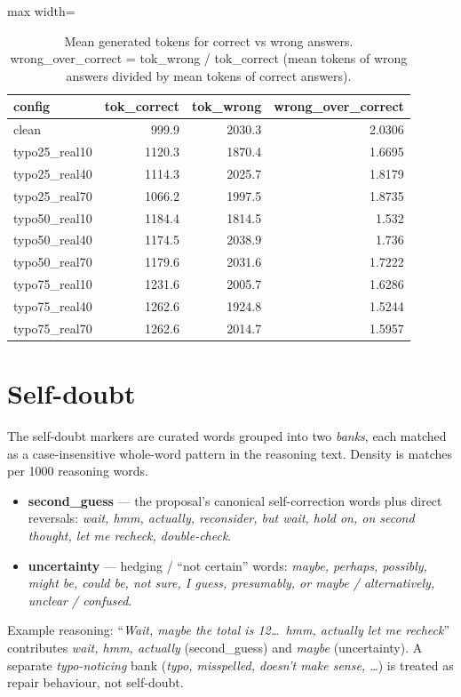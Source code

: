 \documentclass[11pt]{article}
\begin{document}
\begin{table}[H]
\centering
\caption{Mean generated tokens for correct vs wrong answers. wrong\_over\_correct = tok\_wrong / tok\_correct (mean tokens of wrong answers divided by mean tokens of correct answers).}
\small
\begin{adjustbox}{max width=\textwidth}
\begin{tabular}{lrrr}
\toprule
\textbf{config} & \textbf{tok\_correct} & \textbf{tok\_wrong} & \textbf{wrong\_over\_correct} \\
\midrule
clean & 999.9 & 2030.3 & 2.0306 \\
typo25\_real10 & 1120.3 & 1870.4 & 1.6695 \\
typo25\_real40 & 1114.3 & 2025.7 & 1.8179 \\
typo25\_real70 & 1066.2 & 1997.5 & 1.8735 \\
typo50\_real10 & 1184.4 & 1814.5 & 1.532 \\
typo50\_real40 & 1174.5 & 2038.9 & 1.736 \\
typo50\_real70 & 1179.6 & 2031.6 & 1.7222 \\
typo75\_real10 & 1231.6 & 2005.7 & 1.6286 \\
typo75\_real40 & 1262.6 & 1924.8 & 1.5244 \\
typo75\_real70 & 1262.6 & 2014.7 & 1.5957 \\
\bottomrule
\end{tabular}
\end{adjustbox}
\end{table}

\section*{Self-doubt}
\noindent The self-doubt markers are curated words grouped into two
\emph{banks}, each matched as a case-insensitive whole-word pattern in the reasoning
text. Density is matches per 1000 reasoning words.
\begin{itemize}\setlength{\itemsep}{1pt}
  \item \textbf{second\_guess} --- the proposal's canonical self-correction words plus
  direct reversals: \emph{wait, hmm, actually, reconsider, but wait, hold on, on second
  thought, let me recheck, double-check}.
  \item \textbf{uncertainty} --- hedging / ``not certain'' words: \emph{maybe, perhaps,
  possibly, might be, could be, not sure, I guess, presumably, or maybe / alternatively,
  unclear / confused}.
\end{itemize}
\noindent Example reasoning: ``\emph{Wait, maybe the total is 12\dots\ hmm, actually let
me recheck}'' contributes \emph{wait, hmm, actually} (second\_guess) and \emph{maybe}
(uncertainty). A separate \emph{typo-noticing} bank (\emph{typo, misspelled, doesn't make
sense, \dots}) is treated as repair behaviour, not self-doubt.
\medskip
\end{document}
